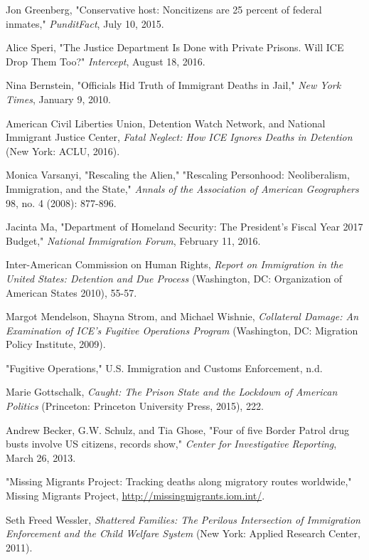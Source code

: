\documentclass[fontset=fandol, a4paper, 12pt, openright]{ctexbook}
\begin{document}
\begin{enumerate}[label={[\arabic*]}]
    \item Jon Greenberg, "Conservative host: Noncitizens are 25 percent of federal inmates," \textit{PunditFact}, July 10, 2015.
    \item Alice Speri, "The Justice Department Is Done with Private Prisons. Will ICE Drop Them Too?" \textit{Intercept}, August 18, 2016.
    \item Nina Bernstein, "Officials Hid Truth of Immigrant Deaths in Jail," \textit{New York Times}, January 9, 2010.
    \item American Civil Liberties Union, Detention Watch Network, and National Immigrant Justice Center, \textit{Fatal Neglect: How ICE Ignores Deaths in Detention} (New York: ACLU, 2016).
    \item Monica Varsanyi, "Rescaling the Alien," "Rescaling Personhood: Neoliberalism, Immigration, and the State," \textit{Annals of the Association of American Geographers} 98, no. 4 (2008): 877-896.
    \item Jacinta Ma, "Department of Homeland Security: The President's Fiscal Year 2017 Budget," \textit{National Immigration Forum}, February 11, 2016.
    \item Inter-American Commission on Human Rights, \textit{Report on Immigration in the United States: Detention and Due Process} (Washington, DC: Organization of American States 2010), 55-57.
    \item Margot Mendelson, Shayna Strom, and Michael Wishnie, \textit{Collateral Damage: An Examination of ICE's Fugitive Operations Program} (Washington, DC: Migration Policy Institute, 2009).
    \item "Fugitive Operations," U.S. Immigration and Customs Enforcement, n.d.
    \item Marie Gottschalk, \textit{Caught: The Prison State and the Lockdown of American Politics} (Princeton: Princeton University Press, 2015), 222.
    \item Andrew Becker, G.W. Schulz, and Tia Ghose, "Four of five Border Patrol drug busts involve US citizens, records show," \textit{Center for Investigative Reporting}, March 26, 2013.
    \item "Missing Migrants Project: Tracking deaths along migratory routes worldwide," Missing Migrants Project, \url{http://missingmigrants.iom.int/}.
    \item Seth Freed Wessler, \textit{Shattered Families: The Perilous Intersection of Immigration Enforcement and the Child Welfare System} (New York: Applied Research Center, 2011).

\end{enumerate}
\end{document}
